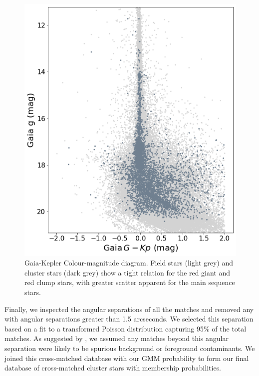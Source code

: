 \begin{figure}[htb]
    \centering
    \includegraphics[scale=0.5]{Chapter4/kic_gaia_photometric_comparison.png}
    \caption[Gaia-Kepler colour magnitude diagram]{Gaia-Kepler Colour-magnitude diagram. Field stars (light grey) and cluster stars (dark grey) show a tight relation for the red giant and red clump stars, with greater scatter apparent for the main sequence stars.}
    \label{fig:KGcmd}
\end{figure}

Finally, we inspected the angular separations of all the matches %
and removed any with angular separations greater than 1.5 arcseconds. We selected this separation based on a fit to a transformed Poisson distribution capturing 95\% of the total matches. As suggested by \citet{berger_revised_2018}, we assumed any matches beyond this angular separation were likely to be spurious background or foreground contaminants. We joined this cross-matched database with our GMM probability to form our final database of cross-matched cluster stars with membership probabilities. 

